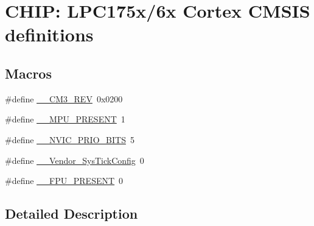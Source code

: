 \hypertarget{group__CMSIS__175X__6X__COMMON}{\section{C\-H\-I\-P\-: L\-P\-C175x/6x Cortex C\-M\-S\-I\-S definitions}
\label{group__CMSIS__175X__6X__COMMON}
}
\subsection*{Macros}
\begin{DoxyCompactItemize}
\item 
\#define \hyperlink{group__CMSIS__175X__6X__COMMON_gac6a3f185c4640e06443c18b3c8d93f53}{\-\_\-\-\_\-\-C\-M3\-\_\-\-R\-E\-V}~0x0200
\item 
\#define \hyperlink{group__CMSIS__175X__6X__COMMON_ga4127d1b31aaf336fab3d7329d117f448}{\-\_\-\-\_\-\-M\-P\-U\-\_\-\-P\-R\-E\-S\-E\-N\-T}~1
\item 
\#define \hyperlink{group__CMSIS__175X__6X__COMMON_gae3fe3587d5100c787e02102ce3944460}{\-\_\-\-\_\-\-N\-V\-I\-C\-\_\-\-P\-R\-I\-O\-\_\-\-B\-I\-T\-S}~5
\item 
\#define \hyperlink{group__CMSIS__175X__6X__COMMON_gab58771b4ec03f9bdddc84770f7c95c68}{\-\_\-\-\_\-\-Vendor\-\_\-\-Sys\-Tick\-Config}~0
\item 
\#define \hyperlink{group__CMSIS__175X__6X__COMMON_gac1ba8a48ca926bddc88be9bfd7d42641}{\-\_\-\-\_\-\-F\-P\-U\-\_\-\-P\-R\-E\-S\-E\-N\-T}~0
\end{DoxyCompactItemize}


\subsection{Detailed Description}


